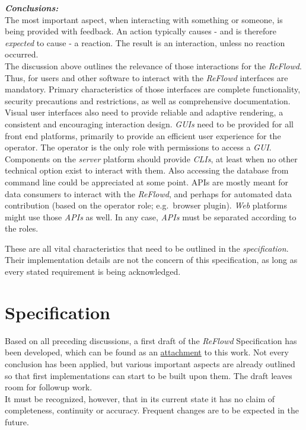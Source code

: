 \documentclass[12pt,english,a4paper,titlepage,cleardoublepage=empty,dottedtoc]{report}
\begin{document}
\emph{\textbf{Conclusions:}} ~\\
The most important aspect, when interacting with something or someone,
is being provided with feedback. An action typically causes - and is
therefore \emph{expected} to cause - a reaction. The result is an
interaction, unless no reaction occurred.\\
The discussion above outlines the relevance of those interactions for
the \emph{ReFlowd}. Thus, for users and other software to interact with
the \emph{ReFlowd} interfaces are mandatory. Primary characteristics of
those interfaces are complete functionality, security precautions and
restrictions, as well as comprehensive documentation. Visual user
interfaces also need to provide reliable and adaptive rendering, a
consistent and encouraging interaction design. \emph{GUIs} need to be
provided for all front end platforms, primarily to provide an efficient
user experience for the operator. The operator is the only role with
permissions to access a \emph{GUI}.\\
Components on the \emph{server} platform should provide \emph{CLIs}, at
least when no other technical option exist to interact with them. Also
accessing the database from command line could be appreciated at some
point. APIs are mostly meant for data consumers to interact with the
\emph{ReFlowd}, and perhaps for automated data contribution (based on
the operator role; e.g.~browser plugin). \emph{Web} platforms might use
those \emph{APIs} as well. In any case, \emph{APIs} must be separated
according to the roles.

These are all vital characteristics that need to be outlined in the
\emph{specification}. Their implementation details are not the concern
of this specification, as long as every stated requirement is being
acknowledged.

\chapter{Specification}\label{specification}

Based on all preceding discussions, a first draft of the \emph{ReFlowd}
Specification has been developed, which can be found as an
\protect\hyperlink{reflowd-working-draft}{attachment} to this work. Not
every conclusion has been applied, but various important aspects are
already outlined so that first implementations can start to be built
upon them. The draft leaves room for followup work.\\
It must be recognized, however, that in its current state it has no
claim of completeness, continuity or accuracy. Frequent changes are to
be expected in the future.
\end{document}
